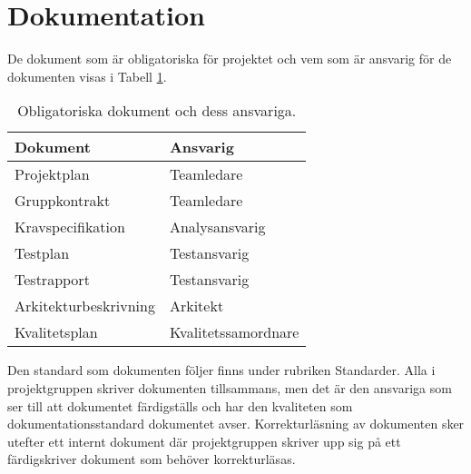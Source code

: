 \newpage
\section{Dokumentation}
De dokument som är obligatoriska för projektet och vem som är ansvarig för de dokumenten visas i Tabell \ref{tab:tabell1}.
\begin{table}
\caption{Obligatoriska dokument och dess ansvariga.}
\begin{center}
\begin{tabular}{| l | l |}
\hline
\textbf{Dokument} & \textbf{Ansvarig} \\
\hline
Projektplan & Teamledare \\
\hline
Gruppkontrakt & Teamledare \\
\hline
Kravspecifikation & Analysansvarig \\
\hline
Testplan & Testansvarig \\
\hline
Testrapport & Testansvarig \\
\hline
Arkitekturbeskrivning & Arkitekt \\
\hline
Kvalitetsplan & Kvalitetssamordnare \\
\hline
\end{tabular}
\end{center}
\label{tab:tabell1}
\end{table}
Den standard som dokumenten följer finns under rubriken Standarder. Alla i projektgruppen skriver dokumenten tillsammans, men det är den ansvariga som ser till att dokumentet färdigställs och har den kvaliteten som dokumentationsstandard dokumentet avser. Korrekturläsning av dokumenten sker utefter ett internt dokument där projektgruppen skriver upp sig på ett färdigskriver dokument som behöver korrekturläsas.
